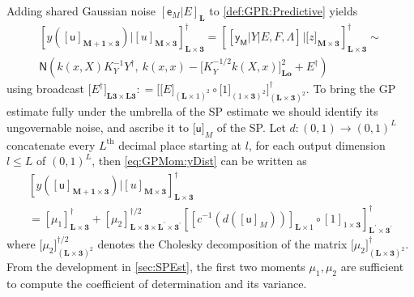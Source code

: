 \documentclass[preprint,12pt]{elsarticle}
\newcommand*{\M}[1]{\ensuremath{#1}\xspace}
\newcommand*{\x}{\times}
\newcommand*{\mi}[1]{\mathbf{#1}}
\newcommand*{\rv}[1]{\mathsf{#1}}
\newcommand*{\te}[2][]{\left\lbrack{#2}\right\rbrack_{#1}}
\newcommand*{\tte}[2][]{\lbrack{#2}\rbrack_{#1}}
\newcommand*{\deq}{\M{\mathrel{\mathop:}=}}
\newcommand*{\gauss}[2]{\mathsf{N}\!\left({#1,#2}\right)}
\begin{document}
    Adding shared Gaussian noise $\te[\mi{L}]{\rv{e}_M\vert E}$ to \cref{def:GPR:Predictive} yields
    \begin{multline}\label{eq:GPMom:yDist}
        \te[\mi{L\x 3}]{y(\te[\mi{M+1\x 3}]{\rv{u}}) \big\vert \te[\mi{M\x 3}]{u}}^{\dagger} 
        = \te[\mi{L\x 3}]{\te{\rv{y_M} \vert Y \vert E,F,\Lambda} \big\vert \tte[\mi{M\x 3}]{z}}^{\dagger} \sim \\
        \gauss{k(x,X) K_{Y}^{-1} Y^{\dagger}}{\ k(x,x) - \tte[\mi{Lo}]{K_{Y}^{-1/2} k(X,x)}^{2} + E^{\dagger}}
    \end{multline}
    using broadcast $\tte[\mi{L3\x L3}]{E^{\dagger}} \deq \tte[(\mi{L\x 3})^{2}]{\tte[(\mi{L}\x 1)^{2}]{E} \circ \tte[(1\x\mi{3})^{2}]{1}}^{\dagger}$. 
    To bring the GP estimate fully under the umbrella of the SP estimate we should identify its ungovernable noise, and ascribe it to $\tte[M]{\rv{u}}$ of the SP.
    Let $d\colon (0,1) \to (0,1)^{L}$ concatenate every $L^{\mathrm{th}}$ decimal place starting at $l$, for each output dimension $l\leq L$ of $(0,1)^{L}$, then \cref{eq:GPMom:yDist} can be written as
    \begin{multline}\label{eq:GPMom:yReveal}
        \te[\mi{L\x 3}]{y(\te[\mi{M+1\x 3}]{\rv{u}}) \big\vert \te[\mi{M\x 3}]{u}}^{\dagger} \\
        = \te[\mi{L\x 3}]{\mu_{1}}^{\dagger}
        + \te[\mi{L\x 3\x L^{\prime}\x 3^{\prime}}]{\mu_{2}}^{\dagger/2} \te[\mi{L^{\prime}\x 3^{\prime}}]{\te[\mi{L}\x 1]{c^{-1}\!\left(d\left(\te[M]{\rv{u}}\right)\right)} \circ \te[1\x\mi{3}]{1}}^{\dagger}
    \end{multline}
    where $\tte[(\mi{L\x 3})^{2}]{\mu_{2}}^{\dagger/2}$ denotes the Cholesky decomposition of the matrix $\tte[(\mi{L\x 3})^{2}]{\mu_{2}}^{\dagger}$.
    From the development in \cref{sec:SPEst}, the first two moments $\mu_{1},\mu_{2}$ are sufficient to compute the coefficient of determination and its variance. 
    
\end{document}
